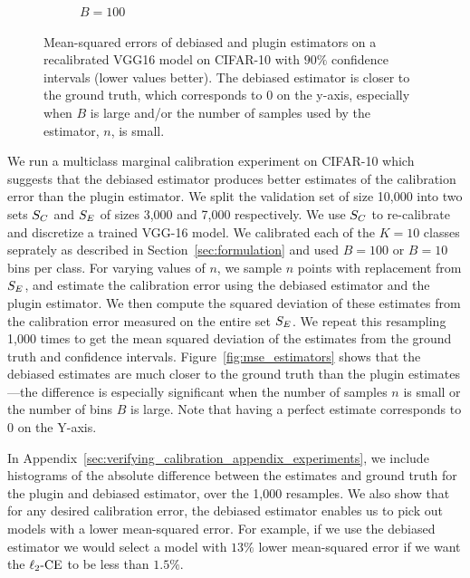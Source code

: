 \begin{figure}
\begin{subfigure}[b]{0.48\textwidth}
         \caption{$B = 100$
         }
         \label{fig:ce_vs_bins_verifying}
     \end{subfigure}
  \caption{
    Mean-squared errors of debiased and plugin estimators on a recalibrated VGG16 model on CIFAR-10 with $90\%$ confidence intervals (lower values better). The debiased estimator is closer to the ground truth, which corresponds to $0$ on the y-axis, especially when $B$ is large and/or the number of samples used by the estimator, $n$, is small.
}
  \label{fig:mse_estimators_bins}
\end{figure}

We run a multiclass marginal calibration experiment on CIFAR-10 which suggests that the debiased estimator produces better estimates of the calibration error than the plugin estimator. We split the validation set of size 10,000 into two sets $S_C{}$ and $S_E{}$ of sizes 3,000 and 7,000 respectively. We use $S_C{}$ to re-calibrate and discretize a trained VGG-16 model. We calibrated each of the $K = 10$ classes seprately as described in Section~\ref{sec:formulation} and used $B = 100$ or $B = 10$ bins per class. For varying values of $n$, we sample $n$ points with replacement from $S_E{}$, and estimate the calibration error using the debiased estimator and the plugin estimator. We then compute the squared deviation of these estimates from the calibration error measured on the entire set $S_E{}$. We repeat this resampling 1,000 times to get the mean squared deviation of the estimates from the ground truth and confidence intervals. Figure~\ref{fig:mse_estimators} shows that the debiased estimates are much closer to the ground truth than the plugin estimates---the difference is especially significant when the number of samples $n$ is small or the number of bins $B$ is large. Note that having a perfect estimate corresponds to $0$ on the Y-axis.

In Appendix~\ref{sec:verifying_calibration_appendix_experiments}, we include histograms of the absolute difference between the estimates and ground truth for the plugin and debiased estimator, over the 1,000 resamples. We also show that for any desired calibration error, the debiased estimator enables us to pick out models with a lower mean-squared error. For example, if we use the debiased estimator we would select a model with $13\%$ lower mean-squared error if we want the $\ell_2\mbox{-CE}$ to be less than $1.5\%$.

